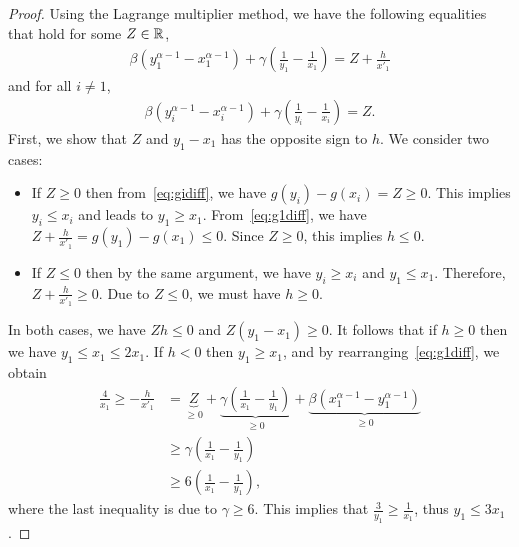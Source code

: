\begin{proof}
    Using the Lagrange multiplier method, we have the following equalities that hold for some $Z \in \mathbb{R}$,
    \begin{align}
        \beta\left( y_1^{\alpha-1} - x_1^{\alpha - 1}\right) + \gamma\left(\frac{1}{y_1} - \frac{1}{x_1}\right) = Z + \frac{h}{x'_1}
        \label{eq:g1diff}
    \end{align}
    and for all $i \neq 1$,
    \begin{align}
        \beta\left( y_i^{\alpha-1} - x_i^{\alpha - 1}\right) + \gamma\left(\frac{1}{y_i} - \frac{1}{x_i}\right) = Z.
        \label{eq:gidiff}
    \end{align}
    First, we show that $Z$ and $y_1 - x_1$ has the opposite sign to $h$. 
    We consider two cases:
    \begin{itemize}
        \item If $Z \geq 0$ then from~\eqref{eq:gidiff}, we have $g(y_i) - g(x_i) = Z \geq 0$. This implies $y_i \leq x_i$ and leads to $y_1 \geq x_1$. From~\eqref{eq:g1diff}, we have $Z + \frac{h}{x'_1} = g(y_1) - g(x_1) \leq 0$. Since $Z \geq 0$, this implies $h \leq 0$.
        \item If $Z \leq 0$ then by the same argument, we have $y_i \geq x_i$ and $y_1 \leq x_1$. Therefore, $Z + \frac{h}{x'_1} \geq 0$. Due to $Z \leq 0$, we must have $h \geq 0$.
    \end{itemize}
    In both cases, we have $Zh \leq 0$ and $Z(y_1 - x_1) \geq 0$. It follows that if $h \geq 0$ then we have $y_1 \leq x_1 \leq 2x_1$. If $h < 0$ then $y_1 \geq x_1$, and by rearranging~\eqref{eq:g1diff}, we obtain
    \begin{align*}
        \frac{4}{x_1} \geq -\frac{h}{x'_1} &= \underbrace{Z}_{\geq 0} + \underbrace{\gamma\left(\frac{1}{x_1} - \frac{1}{y_1}\right)}_{\geq 0} + \underbrace{\beta(x_1^{\alpha-1} - y_1^{\alpha-1})}_{\geq 0} \\
        &\geq \gamma\left(\frac{1}{x_1} - \frac{1}{y_1}\right) \\
        &\geq 6\left(\frac{1}{x_1} - \frac{1}{y_1}\right),
    \end{align*}
    where the last inequality is due to $\gamma \geq 6$. This implies that $\frac{3}{y_1} \geq \frac{1}{x_1}$, thus $y_1 \leq 3x_1$.
\end{proof}

